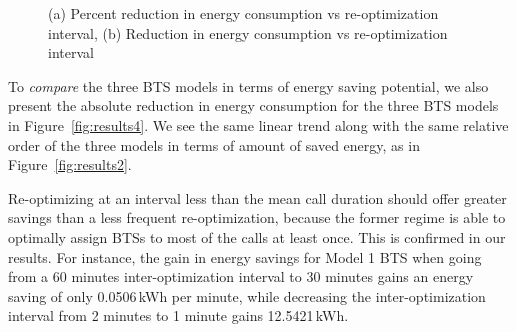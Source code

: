 \begin{figure}
\centering
{}
\caption{(a) Percent reduction in energy consumption vs re-optimization interval, (b) Reduction in energy consumption vs re-optimization interval}
\label{fig:results24}
\end{figure}


To \textit{compare} the three BTS models in terms of energy saving potential, we also present the absolute reduction in energy consumption for the three BTS models in Figure~\ref{fig:results4}. We see the same linear trend along with the same relative order of the three models in terms of amount of saved energy, as in Figure~\ref{fig:results2}.

Re-optimizing at an interval less than the mean call duration should offer greater savings than a less frequent re-optimization, because the former regime is able to optimally assign BTSs to most of the calls at least once. This is confirmed in our results. For instance, the gain in energy savings for Model 1 BTS when going from a 60 minutes inter-optimization interval to 30 minutes gains an energy saving of only 0.0506\,kWh per minute, while decreasing the inter-optimization interval from 2 minutes to 1 minute gains 12.5421\,kWh.

